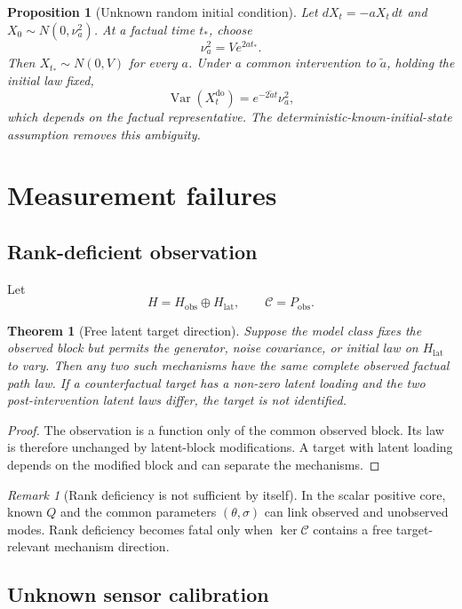 \documentclass[11pt]{article}
\newtheorem{proposition}[assumption]{Proposition}
\newtheorem{theorem}[assumption]{Theorem}
\theoremstyle{remark}
\newtheorem{remark}[assumption]{Remark}
\newcommand{\cC}{\mathcal C}
\newcommand{\Var}{\operatorname{Var}}
\newcommand{\kernel}{\operatorname{ker}}
\newcommand{\obs}{\mathrm{obs}}
\newcommand{\doop}{\operatorname{do}}
\begin{document}
\begin{proposition}[Unknown random initial condition]\label{prop:init}
Let $dX_t=-aX_t\,dt$ and $X_0\sim N(0,\nu_a^2)$. At a factual time $t_*$, choose
\[
 \nu_a^2=Ve^{2at_*}.
\]
Then $X_{t_*}\sim N(0,V)$ for every $a$. Under a common intervention to $\widetilde a$, holding the initial law fixed,
\[
 \Var(X_t^{\doop})=e^{-2\widetilde at}\nu_a^2,
\]
which depends on the factual representative. The deterministic-known-initial-state assumption removes this ambiguity.
\end{proposition}

\section{Measurement failures}

\subsection{Rank-deficient observation}

Let
\[
 H=H_{\obs}\oplus H_{\mathrm{lat}},
 \qquad
 \cC=P_{\obs}.
\]

\begin{theorem}[Free latent target direction]\label{thm:rank}
Suppose the model class fixes the observed block but permits the generator, noise covariance, or initial law on $H_{\mathrm{lat}}$ to vary. Then any two such mechanisms have the same complete observed factual path law. If a counterfactual target has a non-zero latent loading and the two post-intervention latent laws differ, the target is not identified.
\end{theorem}

\begin{proof}
The observation is a function only of the common observed block. Its law is therefore unchanged by latent-block modifications. A target with latent loading depends on the modified block and can separate the mechanisms.
\end{proof}

\begin{remark}[Rank deficiency is not sufficient by itself]
In the scalar positive core, known $Q$ and the common parameters $(\theta,\sigma)$ can link observed and unobserved modes. Rank deficiency becomes fatal only when $\kernel\cC$ contains a free target-relevant mechanism direction.
\end{remark}

\subsection{Unknown sensor calibration}
\end{document}

